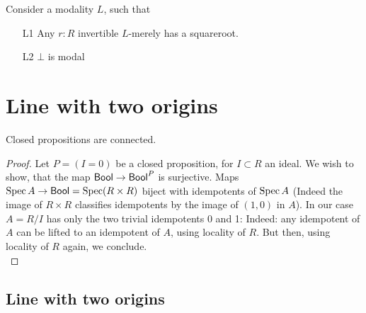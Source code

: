 	Consider a modality $L$, such that
\begin{enumerate}
	\item[L1] Any $r : R$ invertible $L$-merely has a squareroot. 
	
	\item[L2] $\bot$ is modal 
\end{enumerate}

\ifsc
\section{Line with two origins}
\begin{lemma}{\label{lemma:clPropIsCnct}}
	Closed propositions are connected.
\end{lemma}
\begin{proof}
	Let $P = (I = 0)$ be a closed proposition, for $I \subset R$ an ideal. We wish to show, that the map $\mathsf{Bool} \to \mathsf{Bool}^{P}$ is surjective. Maps $\operatorname{Spec} A \to \mathsf{Bool} = \operatorname{Spec} (R \times R)$ biject with idempotents of $\operatorname{Spec} A$ (Indeed the image of $R \times R$ classifies idempotents by the image of $(1,0)$ in $A$). In our case $A = R/I$ has only the two trivial idempotents 0 and 1: Indeed: any idempotent of $A$ can be lifted to an idempotent of $A$, using locality of $R$. But then, using locality of $R$ again, we conclude. \\
\end{proof}
\else
\subsection{Line with two origins}
\fi

